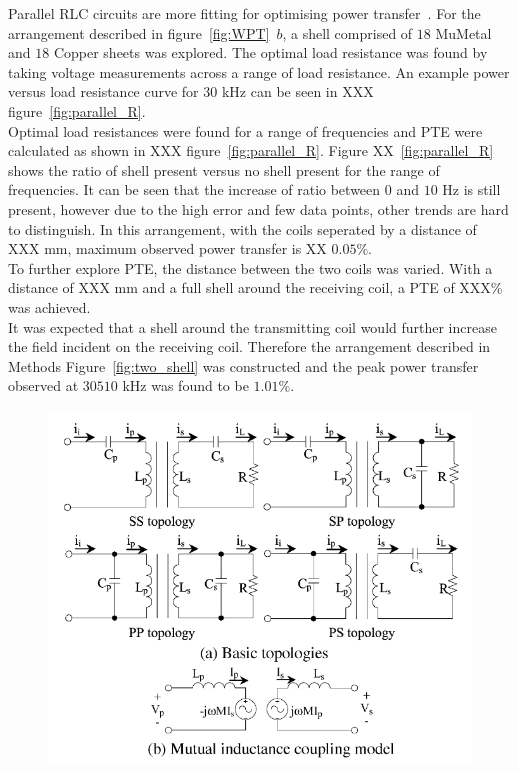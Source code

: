 \documentclass[11pt]{iopart}
\begin{document}
Parallel RLC circuits are more fitting for optimising power
transfer~\cite{XXX}. For the arrangement described in
figure~\ref{fig:WPT}~$b$, a shell comprised of $18$ MuMetal and
$18$ Copper sheets was explored. The optimal load resistance was found
by taking voltage measurements across a range of load resistance. An
example power versus load resistance curve for $30$ kHz can be seen in
XXX figure~\ref{fig:parallel_R}.\\ Optimal load resistances were found
for a range of frequencies and PTE were calculated as shown in XXX
figure~\ref{fig:parallel_R}. Figure XX~\ref{fig:parallel_R} shows the
ratio of shell present versus no shell present for the range of
frequencies. It can be seen that the increase of ratio between $0$ and
$10$ Hz is still present, however due to the high error and few data
points, other trends are hard to distinguish. In this arrangement,
with the coils seperated by a distance of XXX mm, maximum observed
power transfer is XX $0.05\%$.\\
To further explore PTE, the distance between the two coils was
varied. With a distance of XXX mm and a full shell around the
receiving coil, a PTE of XXX\% was achieved.\\
It was expected that a shell around the transmitting coil would
further increase the field incident on the receiving coil. Therefore
the arrangement described in Methods Figure~\ref{fig:two_shell} was
constructed and the peak power transfer observed at $30510$ kHz was
found to be $1.01\%$.\\


\begin{figure}
  \begin{center}
   \noindent\includegraphics[width=0.75\linewidth]{images/temp-equiv_circ.png}
  \label{fig:RLC-eqcirc}
  \end{center}
  \caption{}
\end{figure}
\end{document}
